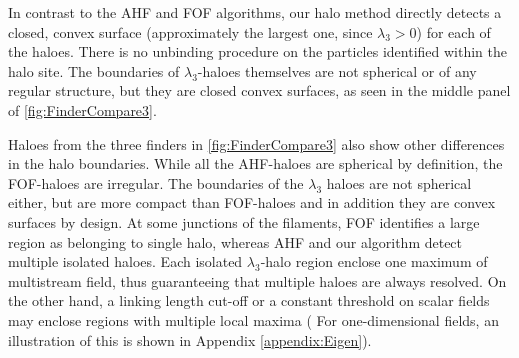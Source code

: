 \documentclass[fleqn,usenatbib,useAMS]{mnras}
\begin{document}
In contrast to the AHF and FOF algorithms, our halo method directly detects a closed, convex surface (approximately the largest one, since $\lambda_3 >0$) for each of the haloes. There is no unbinding procedure on the particles identified within the halo site. The boundaries of $\lambda_3$-haloes themselves are not spherical or of any regular structure, but they are closed convex surfaces, as seen in the middle panel of \autoref{fig:FinderCompare3}. 



Haloes from the three finders in \autoref{fig:FinderCompare3} 
also show other differences in the halo boundaries. While all the AHF-haloes are spherical by definition, the FOF-haloes are irregular. The boundaries of the $\lambda_3$ haloes are not spherical either, but are more compact than FOF-haloes and in addition they are convex surfaces by design. At some junctions of the filaments, FOF identifies a large region as belonging to single halo, whereas AHF and our algorithm detect multiple isolated haloes. Each isolated $\lambda_3$-halo region enclose one maximum of multistream field, thus guaranteeing that multiple haloes are always resolved. On the other hand, a linking length cut-off or a constant threshold on scalar fields may enclose regions with multiple local maxima ( For one-dimensional fields, an illustration of this is shown in Appendix \ref{appendix:Eigen}). 
 
 
 
\end{document}
